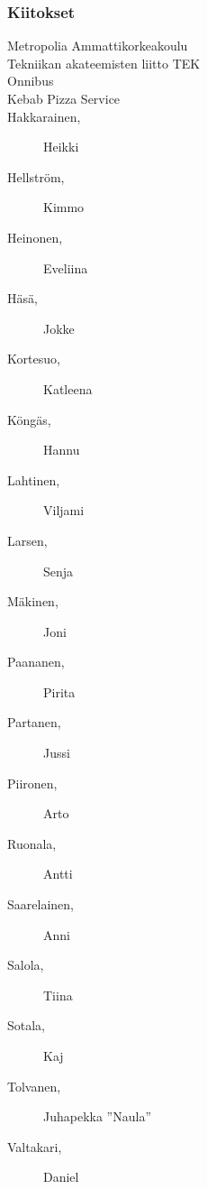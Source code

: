 \subsubsection*{Kiitokset}
\begin{multicols}{2}
\begin{description}
\item[Metropolia Ammattikorkeakoulu] %
\item[Tekniikan akateemisten liitto TEK]
\item[Onnibus]
\item[Kebab Pizza Service]
\item[Hakkarainen, ] Heikki
\item[Hellström, ] Kimmo
\item[Heinonen, ] Eveliina
\item[Häsä, ] Jokke
\item[Kortesuo, ] Katleena
\item[Köngäs, ] Hannu
\item[Lahtinen, ] Viljami
\item[Larsen, ] Senja
\item[Mäkinen, ] Joni
\item[Paananen, ] Pirita
\item[Partanen, ] Jussi
\item[Piironen, ] Arto
\item[Ruonala, ] Antti
\item[Saarelainen, ] Anni
\item[Salola, ] Tiina
\item[Sotala, ] Kaj
\item[Tolvanen, ] Juhapekka ''Naula''
\item[Valtakari, ] Daniel
\end{description}
\end{multicols}
